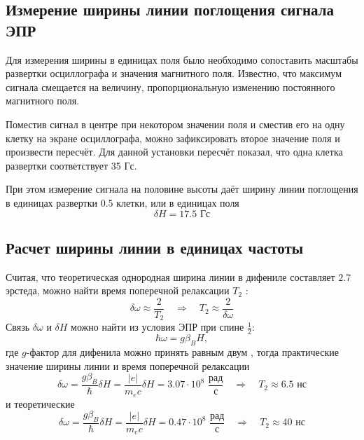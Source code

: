 \documentclass[a4paper,14pt]{extarticle}
\begin{document}
\subsection{Измерение ширины линии поглощения сигнала ЭПР}

Для измерения ширины в единицах поля было необходимо сопоставить масштабы развертки осциллографа и значения магнитного поля. Известно, что максимум сигнала смещается на величину, пропорциональную изменению постоянного магнитного поля. 

Поместив сигнал в центре при некотором значении поля и сместив его на одну клетку на экране осциллографа, можно зафиксировать второе значение поля и произвести пересчёт.  Для данной установки пересчёт показал, что одна клетка развертки соответствует 35 Гс.

При этом измерение сигнала на половине высоты даёт ширину линии поглощения в единицах развертки 0.5 клетки, или в единицах поля
\begin{equation}
  \delta H = 17.5 \text{ Гс}
\end{equation}

\subsection{Расчет ширины линии в единицах частоты}
Считая, что теоретическая однородная ширина линии в дифениле составляет $2.7$ эрстеда, можно найти время поперечной релаксации $T_2$ :
\begin{equation}
  \delta \omega \approx \frac{2}{T_2} \quad \Rightarrow \quad
  T_2 \approx \frac{2}{\delta \omega} 
\end{equation}
Связь $\delta \omega$ и $\delta H$ можно найти из условия ЭПР при спине $\frac12$:
\begin{equation}
  \hbar \omega = g \beta_B H,
\end{equation}
где $g$-фактор для дифенила можно принять равным двум \cite[стр. 16]{mar}, тогда практические значение ширины линии и время поперечной релаксации
\begin{equation}
  \delta \omega = \frac{g\beta_B}{\hbar} \delta H = \frac{|e|}{m_e c} \delta H = 3.07 \cdot 10^8 \,\,\frac{\text{рад}}{\text{с}}
  \quad \Rightarrow \quad
  T_2 \approx 6.5 \text{ нс}
\end{equation}
и теоретические 
\begin{equation}
  \delta \omega = \frac{g\beta_B}{\hbar} \delta H = \frac{|e|}{m_e c} \delta H = 0.47 \cdot 10^8 \,\,\frac{\text{рад}}{\text{с}}
  \quad \Rightarrow \quad
  T_2 \approx 40 \text{ нс}
\end{equation}
\end{document}

